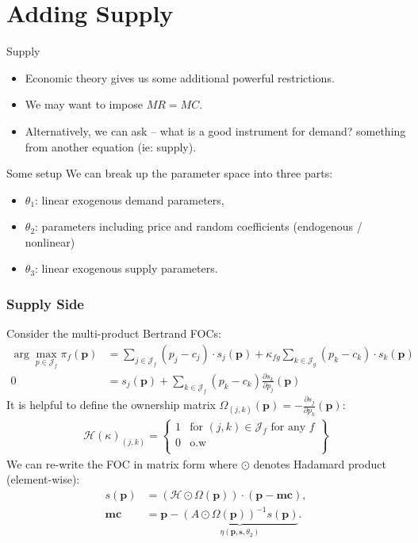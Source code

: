 \section{Adding Supply}
\begin{frame}{Supply}
\begin{itemize}
\item Economic theory gives us some additional powerful restrictions.
\item We may want to impose $MR = MC$.
\item Alternatively, we can ask -- what is a good instrument for demand? \alert{something from another equation} (ie: supply).
\end{itemize}
\end{frame}

\begin{frame}{Some setup}
We can break up the parameter space into three parts:
\begin{itemize}
\item $\theta_1$: linear exogenous demand parameters, 
 \item $\theta_2$: parameters including price and random coefficients (endogenous / nonlinear)
 \item $\theta_3$: linear exogenous supply parameters.
\end{itemize}
\end{frame}



\begin{frame}[plain]
\frametitle{Supply Side}
Consider the multi-product Bertrand FOCs:
\footnotesize
{\begin{align*}
\arg \max_{p \in \mathcal{J}_f} \pi_f (\mathbf{p}) &= \sum_{j \in \mathcal{J}_f} (p_j - c_j) \cdot s_j(\mathbf{p}) +  \kappa_{fg}\sum_{k \in \mathcal{J}_g} (p_k - c_k) \cdot s_k(\mathbf{p}) \\
0&= s_j(\mathbf{p}) + \sum_{k \in \mathcal{J}_f} (p_k - c_k) \frac{\partial s_{k}}{\partial p_j}(\mathbf{p}) 
\end{align*}
}
It is helpful to define the \alert{ownership matrix} $\Omega_{(j,k)}(\mathbf{p})  = - \frac{\partial s_{j}}{\partial p_k}(\mathbf{p})$:
\begin{align*}
\mathcal{H}(\kappa)_{(j,k)} = \left\{\begin{array}{lr}
          1 & \text{for }  (j,k) \in \mathcal{J}_f \text{ for any } f \\ 
      0 & \text{o.w}\\
        \end{array} \right\}
\end{align*}
We can re-write the FOC in matrix form where $\odot$ denotes Hadamard product (element-wise):
\begin{align*}
        s(\mathbf{p}) &= (\mathcal{H} \odot \Omega(\mathbf{p})) \cdot (\mathbf{p} - \mathbf{mc}), \\
       \mathbf{mc} &=  \mathbf{p} - \underbrace{(A \odot \Omega(\mathbf{p}))^{-1} s(\mathbf{p})}_{\eta(\mathbf{p},\mathbf{s},\theta_2)}.
\end{align*}
\end{frame}



